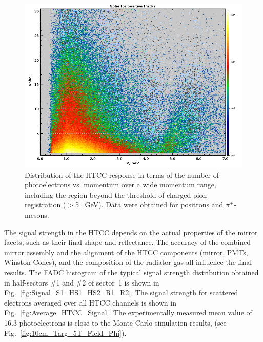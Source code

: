 \begin{figure}[!ht]
    \centering
    \includegraphics[width=1.0\linewidth,trim={0.0cm 0.0cm 0.0cm 0.0cm},clip]{images/positivePNPEC6595.png}
    \caption{Distribution of the HTCC response in terms of the number of photoelectrons vs. momentum over a wide
      momentum range, including the region beyond the threshold of charged pion registration ($>$5 ~GeV). Data were
      obtained for positrons and $\pi^+$-mesons.}
    \label{fig:positivePNPEC6595}
\end{figure}


The signal strength in the HTCC depends on the actual properties of the mirror facets, such as their final shape
and reflectance. The accuracy of the combined mirror assembly and the alignment of the HTCC components (mirror,
PMTs, Winston Cones), and the composition of the radiator gas all influence the final results. The FADC histogram of
the typical signal strength distribution obtained in half-sectors \#1 and \#2 of sector~1 is shown in
Fig.~\ref{fig:Signal_S1_HS1_HS2_R1_R2}. The signal strength for scattered electrons averaged over all HTCC
channels is shown in Fig.~\ref{fig:Average_HTCC_Signal}. The experimentally measured mean value of 16.3
photoelectrons is close to the Monte Carlo simulation results, (see Fig.~\ref{fig:10cm_Targ_5T_Field_Phi}).

